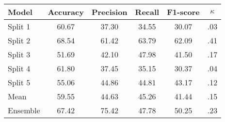 \begin{tabular}{lccccc}
    \toprule
    Model & Accuracy & Precision & Recall & F1-score & $\kappa$ \\
    \midrule
    Split 1 & 60.67 & 37.30 & 34.55 & 30.07 & .03 \\
    Split 2 & 68.54 & 61.42 & 63.79 & 62.09 & .41 \\
    Split 3 & 51.69 & 42.10 & 47.98 & 41.50 & .17 \\
    Split 4 & 61.80 & 37.45 & 35.15 & 30.37 & .04 \\ 
    Split 5 & 55.06 & 44.86 & 44.81 & 43.17 & .12 \\
    \midrule
    Mean & 59.55 & 44.63 & 45.26 & 41.44 & .15 \\
    Ensemble & 67.42 & 75.42 & 47.78 & 50.25 & .23 \\
    \bottomrule
\end{tabular}